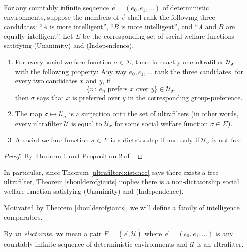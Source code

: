 \documentclass[twoside,11pt]{article}
\begin{document}
\begin{theorem}
\label{shoulderofgiants}
    For any countably infinite
    sequence $\vec{e}=(e_0,e_1,\ldots)$ of deterministic environments, suppose the
    members of $\vec{e}$
    shall rank the following three candidates: ``$A$ is more intelligent'',
    ``$B$ is more intelligent'', and ``$A$ and $B$ are equally intelligent''.
    Let $\Sigma$ be the corresponding set of social welfare functions satisfying
    (Unanimity) and (Independence).
    \begin{enumerate}
        \item
        For every social welfare function $\sigma\in\Sigma$, there is exactly one
        ultrafilter $\mathscr U_\sigma$ with the following property:
        Any way $e_0,e_1,\ldots$ rank the three candidates, for every two candidates
        $x$ and $y$,
        if
        \[
            \{n\,:\,\mbox{$e_n$ prefers $x$ over $y$}\} \in \mathscr U_\sigma,
        \]
        then $\sigma$ says that $x$ is preferred
        over $y$ in the corresponding group-preference.
        \item
        The map $\sigma\mapsto \mathscr U_\sigma$ is a surjection onto the set of ultrafilters
        (in other words, every ultrafilter $\mathscr U$ is equal to $\mathscr U_\sigma$ for
        some social welfare function $\sigma\in\Sigma$).
        \item
        A social welfare function $\sigma\in\Sigma$ is a dictatorship if and only if
        $\mathscr U_\sigma$ is not free.
    \end{enumerate}
\end{theorem}

\begin{proof}
    By Theorem 1 and Proposition 2 of \citet{kirman}.
\end{proof}

In particular, since Theorem \ref{ultrafilterexistence} says there exists a free
ultrafilter, Theorem \ref{shoulderofgiants} implies there is a non-dictatorship
social welfare function satisfying (Unanimity) and (Independence).

Motivated by Theorem \ref{shoulderofgiants}, we will define a family of intelligence
comparators.

\begin{definition}
    By an \emph{electorate}, we mean a
    pair $E=(\vec{e}, \mathscr U)$ where
    $\vec{e}=(e_0,e_1,\ldots)$ is any countably infinite sequence of deterministic environments
    and $\mathscr U$ is an ultrafilter.
\end{definition}
\end{document}
